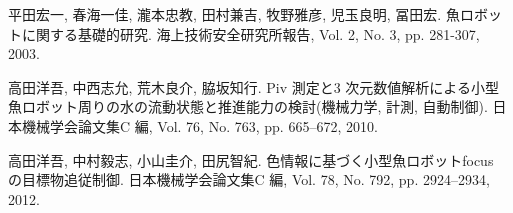 
\newpage
\begin{thebibliography}{9}
    平田宏一, 春海一佳, 瀧本忠教, 田村兼吉, 牧野雅彦, 児玉良明, 冨田宏. 魚ロボットに関する基礎的研究. 海上技術安全研究所報告, Vol. 2, No. 3, pp. 281-307, 2003.
 
    高田洋吾, 中西志允, 荒木良介, 脇坂知行. Piv 測定と3 次元数値解析による小型魚ロボット周りの水の流動状態と推進能力の検討(機械力学, 計測, 自動制御). 日本機械学会論文集C 編, Vol. 76, No. 763, pp. 665–672, 2010.

    高田洋吾, 中村毅志, 小山圭介, 田尻智紀. 色情報に基づく小型魚ロボットfocus の目標物追従制御. 日本機械学会論文集C 編, Vol. 78, No. 792, pp. 2924–2934, 2012.
\end{thebibliography}


